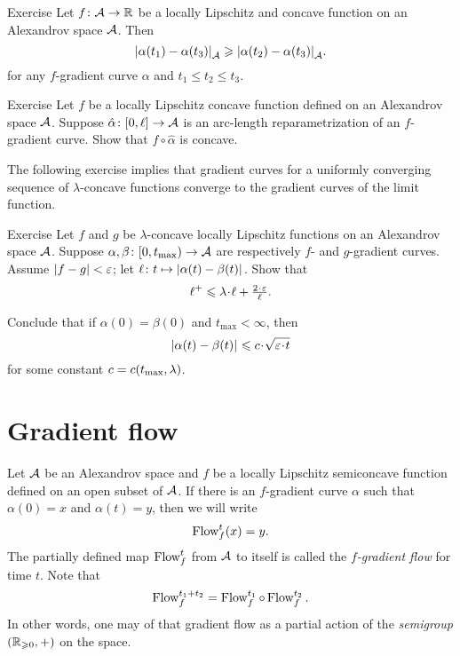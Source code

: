 \begin{thm}{Exercise}\label{ex:elf-contracting}
Let $f\colon\mathcal{A}\to\mathbb{R}$ be a locally Lipschitz and concave function on an Alexandrov space
$\mathcal{A}$.
Then 
\[|{\alpha(t_1)}-{\alpha(t_3)}|_{\mathcal{A}}^{{}}\geqslant |{\alpha(t_2)}-{\alpha(t_3)}|_{\mathcal{A}}^{{}}.\]
for any $f$-gradient curve $\alpha$ and $t_1\le t_2\le t_3$.
\end{thm}

\begin{thm}{Exercise}\label{ex:mayer}
Let $f$ be a locally Lipschitz concave function defined on an Alexandrov space $\mathcal{A}$.
Suppose $\hat\alpha\colon[0,\ell]\to\mathcal{A}$ is an arc-length reparametrization of an $f$-gradient curve.
Show that $f\circ\hat\alpha$ is concave.
\end{thm}




The following exercise implies that gradient curves for a uniformly converging sequence of $\lambda$-concave functions converge to the gradient curves of the limit function.

\begin{thm}{Exercise}\label{lem:fg-dist-est}
Let $f$ and $g$ be $\lambda$-concave locally Lipschitz functions on an Alexandrov space $\mathcal{A}$.
Suppose
$\alpha,\beta\colon[0,t_{\max})\to \mathcal{A}$ are respectively $f$- and $g$-gradient curves.
Assume $|f-g|<\varepsilon$; let $\ell\colon t\mapsto|{\alpha(t)}-{\beta(t)}|_{}^{{}}$.
Show that
\[\ell^+\le \lambda\cdot\ell+\tfrac{2\cdot\eps}{\ell}.\]

Conclude that if $\alpha(0)=\beta(0)$ and $t_{\max}<\infty$, then
\[\dist{\alpha(t)}{\beta(t)}{}
\le
\Const\cdot\sqrt{\eps\cdot t}\]
for some constant $c=c(t_{\max},\lambda)$.
\end{thm}

\section{Gradient flow}

Let $\mathcal{A}$ be an Alexandrov space 
and $f$ be a locally Lipschitz semiconcave function defined on an open subset of $\mathcal{A}$.
If there is an $f$-gradient curve $\alpha$ such that $\alpha(0)=x$ and $\alpha(t)=y$,
then we will write 
\[\mathop{\rm Flow}\nolimits^t_f(x)=y.\]
The partially defined map $\mathop{\rm Flow}\nolimits^t_f$ from $\mathcal{A}$ to itself is called the \emph{$f$-gradient flow} for time $t$.
Note that
\[\mathop{\rm Flow}\nolimits^{t_1+t_2}_f=\mathop{\rm Flow}\nolimits_f^{t_1}\circ\mathop{\rm Flow}\nolimits_f^{t_2}.\]
In other words, one may of that gradient flow as a partial action of the \textit{semigroup} $(\mathbb{R}_{\geqslant0},+)$ on the space.
 
